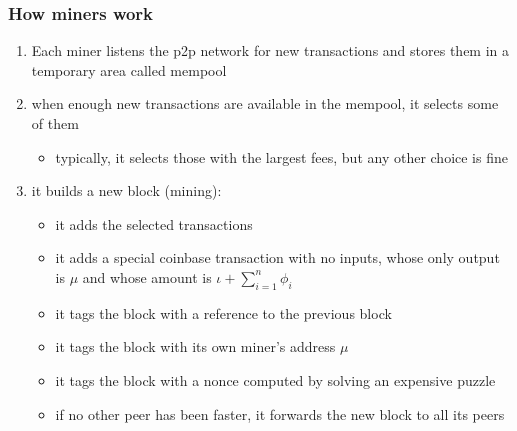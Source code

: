 \documentclass[11pt]{beamer}  %
\begin{document}
\begin{frame}\frametitle{How miners work}

  \begin{enumerate}
    \item Each miner listens the p2p network for new transactions and stores them in a
      temporary area called mempool
    \item when enough new transactions are available in the mempool, it selects some of them
      \begin{itemize}
      \item typically, it selects those with the largest fees, but any other choice is fine
      \end{itemize}
    \item it builds a new block (\alert{mining}):
      \begin{itemize}
      \item it adds the selected transactions
      \item it adds a special \alert{coinbase transaction} with no inputs, whose only output is $\mu$
        and whose amount is $\iota+\sum_{i=1}^n\phi_i$
      \item it tags the block with a reference to the previous block
      \item it tags the block with its own miner's address $\mu$
      \item it tags the block with a nonce computed by solving an expensive puzzle
      \item if no other peer has been faster, it forwards the new block to all its peers
      \end{itemize}
  \end{enumerate}
\end{frame}
\end{document}
